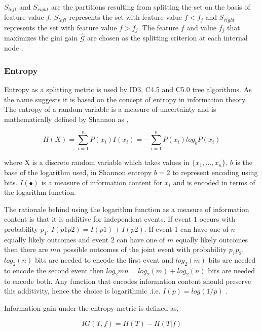 \documentclass[final,3p,times,twocolumn]{elsarticle}
\begin{document}
$S_{left}$ and $S_{right}$ are the partitions resulting from splitting the set on the basis of feature value $f$. $S_{left}$ represents the set with feature value $f < f_{j}$ and $S_{right}$ represents the set with feature value $f > f_{j}$. The feature $f$ and value $f_{j}$ that maximizes the gini gain $\hat{\mathcal{G}}$ are chosen as the splitting criterion at each internal node \cite{GINI}.

\subsubsection{Entropy}

Entropy as a splitting metric is used by  ID3, C4.5 and C5.0 tree algorithms. As the name suggests it is based on the concept of entropy in information theory. The entropy of a random variable is a measure of uncertainty and is mathematically defined by Shannon as \cite{ENT}, 

\begin{equation}
H(X) = \sum_{i=1}^n P(x_{i})I(x_{i}) = - \sum_{i=1}^n P(x_{i})log_{b}P(x_{i})
\end{equation} 

where X is a discrete random variable which takes values in $\{x_{1},...,x_{n}\}$, $b$ is the base of the logarithm used, in Shannon entropy $b = 2$ to represent encoding using bits. $I(\bullet)$ is a measure of information content for $x_{i}$ and is encoded in terms of the logarithm function.

The rationale behind using the logarithm function as a measure of information content is that it is additive for independent events. If event $1$ occurs with probability $p_{1}$, $I(p1p2) = I(p1) + I(p2)$.
If event 1 can have one of $n$ equally likely outcomes and event $2$ can have one of $m$ equally likely outcomes then there are $mn$ possible outcomes of the joint event with probability $p_{1}p_{2}$.  $log_{2}(n)$ bits are needed to encode the first event and $log_{2}(m)$ bits are needed to encode the second event then $log_2{mn} = log_2(m) + log_2(n)$ bits are needed to encode both. Any function that encodes information content should preserve this additivity, hence the choice is logarithmic .i.e. $I(p) = log(1/p)$ \cite{ENT}.
  
Information gain under the entropy metric is defined as, 

\begin{equation}
IG(T,f) = H(T) - H(T|f)
\end{equation}
\end{document}
